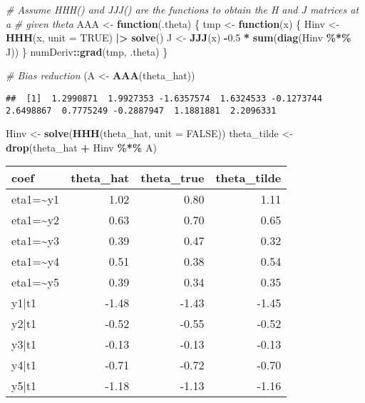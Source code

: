 \documentclass[
]{article}
\newenvironment{Shaded}{\begin{snugshade}}{\end{snugshade}}
\newcommand{\AttributeTok}[1]{\textcolor[rgb]{0.13,0.29,0.53}{#1}}
\newcommand{\CommentTok}[1]{\textcolor[rgb]{0.56,0.35,0.01}{\textit{#1}}}
\newcommand{\ConstantTok}[1]{\textcolor[rgb]{0.56,0.35,0.01}{#1}}
\newcommand{\ControlFlowTok}[1]{\textcolor[rgb]{0.13,0.29,0.53}{\textbf{#1}}}
\newcommand{\FloatTok}[1]{\textcolor[rgb]{0.00,0.00,0.81}{#1}}
\newcommand{\FunctionTok}[1]{\textcolor[rgb]{0.13,0.29,0.53}{\textbf{#1}}}
\newcommand{\NormalTok}[1]{#1}
\newcommand{\OtherTok}[1]{\textcolor[rgb]{0.56,0.35,0.01}{#1}}
\newcommand{\SpecialCharTok}[1]{\textcolor[rgb]{0.81,0.36,0.00}{\textbf{#1}}}
\begin{document}
\begin{Shaded}
\begin{Highlighting}[]
\CommentTok{\# Assume HHH() and JJJ() are the functions to obtain the H and J matrices at a}
\CommentTok{\# given theta}
\NormalTok{AAA }\OtherTok{\textless{}{-}} \ControlFlowTok{function}\NormalTok{(.theta) \{}
\NormalTok{  tmp }\OtherTok{\textless{}{-}} \ControlFlowTok{function}\NormalTok{(x) \{}
\NormalTok{    Hinv }\OtherTok{\textless{}{-}} \FunctionTok{HHH}\NormalTok{(x, }\AttributeTok{unit =} \ConstantTok{TRUE}\NormalTok{) }\SpecialCharTok{|\textgreater{}} \FunctionTok{solve}\NormalTok{()}
\NormalTok{    J    }\OtherTok{\textless{}{-}} \FunctionTok{JJJ}\NormalTok{(x)}
    \SpecialCharTok{{-}}\FloatTok{0.5} \SpecialCharTok{*} \FunctionTok{sum}\NormalTok{(}\FunctionTok{diag}\NormalTok{(Hinv }\SpecialCharTok{\%*\%}\NormalTok{ J))}
\NormalTok{  \}}
\NormalTok{  numDeriv}\SpecialCharTok{::}\FunctionTok{grad}\NormalTok{(tmp, .theta)}
\NormalTok{\}}

\CommentTok{\# Bias reduction}
\NormalTok{(A }\OtherTok{\textless{}{-}} \FunctionTok{AAA}\NormalTok{(theta\_hat))}
\end{Highlighting}
\end{Shaded}

\begin{verbatim}
##  [1]  1.2990871  1.9927353 -1.6357574  1.6324533 -0.1273744  2.6498867  0.7775249 -0.2887947  1.1881881  2.2096331
\end{verbatim}

\begin{Shaded}
\begin{Highlighting}[]
\NormalTok{Hinv }\OtherTok{\textless{}{-}} \FunctionTok{solve}\NormalTok{(}\FunctionTok{HHH}\NormalTok{(theta\_hat, }\AttributeTok{unit =} \ConstantTok{FALSE}\NormalTok{))}
\NormalTok{theta\_tilde }\OtherTok{\textless{}{-}} \FunctionTok{drop}\NormalTok{(theta\_hat }\SpecialCharTok{+}\NormalTok{ Hinv }\SpecialCharTok{\%*\%}\NormalTok{ A)}
\end{Highlighting}
\end{Shaded}

\begin{tabular}[t]{lrrr}
\toprule
coef & theta\_hat & theta\_true & theta\_tilde\\
\midrule
eta1=\textasciitilde{}y1 & 1.02 & 0.80 & 1.11\\
eta1=\textasciitilde{}y2 & 0.63 & 0.70 & 0.65\\
eta1=\textasciitilde{}y3 & 0.39 & 0.47 & 0.32\\
eta1=\textasciitilde{}y4 & 0.51 & 0.38 & 0.54\\
eta1=\textasciitilde{}y5 & 0.39 & 0.34 & 0.35\\
\addlinespace
y1|t1 & -1.48 & -1.43 & -1.45\\
y2|t1 & -0.52 & -0.55 & -0.52\\
y3|t1 & -0.13 & -0.13 & -0.13\\
y4|t1 & -0.71 & -0.72 & -0.70\\
y5|t1 & -1.18 & -1.13 & -1.16\\
\bottomrule
\end{tabular}
\end{document}
